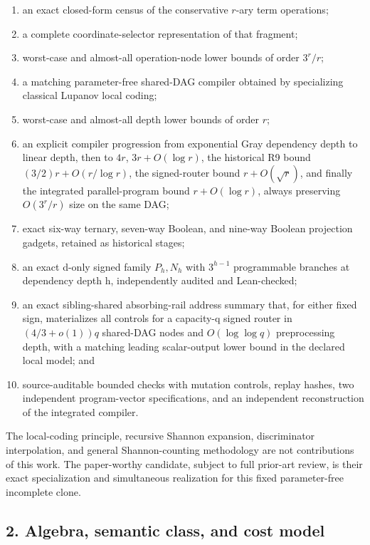 \documentclass[
  11pt,
]{article}
\providecommand{\tightlist}{%
  \setlength{\itemsep}{0pt}\setlength{\parskip}{0pt}}
\theoremstyle{definition}
\theoremstyle{remark}
\begin{document}
\begin{enumerate}
\def\labelenumi{\arabic{enumi}.}
\tightlist
\item
  an exact closed-form census of the conservative \(r\)-ary term
  operations;
\item
  a complete coordinate-selector representation of that fragment;
\item
  worst-case and almost-all operation-node lower bounds of order
  \(3^r/r\);
\item
  a matching parameter-free shared-DAG compiler obtained by specializing
  classical Lupanov local coding;
\item
  worst-case and almost-all depth lower bounds of order \(r\);
\item
  an explicit compiler progression from exponential Gray dependency
  depth to linear depth, then to \(4r\), \(3r+O(\log r)\), the
  historical R9 bound \((3/2)r+O(r/\log r)\), the signed-router bound
  \(r+O(\sqrt{r})\), and finally the integrated parallel-program bound
  \(r+O(\log r)\), always preserving \(O(3^r/r)\) size on the same DAG;
\item
  exact six-way ternary, seven-way Boolean, and nine-way Boolean
  projection gadgets, retained as historical stages;
\item
  an exact d-only signed family \(P_h,N_h\) with \(3^{h-1}\)
  programmable branches at dependency depth h, independently audited and
  Lean-checked;
\item
  an exact sibling-shared absorbing-rail address summary that, for
  either fixed sign, materializes all controls for a capacity-q signed
  router in \((4/3+o(1))q\) shared-DAG nodes and \(O(\log \log q)\)
  preprocessing depth, with a matching leading scalar-output lower bound
  in the declared local model; and
\item
  source-auditable bounded checks with mutation controls, replay hashes,
  two independent program-vector specifications, and an independent
  reconstruction of the integrated compiler.
\end{enumerate}

The local-coding principle, recursive Shannon expansion, discriminator
interpolation, and general Shannon-counting methodology are not
contributions of this work. The paper-worthy candidate, subject to full
prior-art review, is their exact specialization and simultaneous
realization for this fixed parameter-free incomplete clone.

\hypertarget{algebra-semantic-class-and-cost-model}{%
\subsection{2. Algebra, semantic class, and cost
model}\label{algebra-semantic-class-and-cost-model}}
\end{document}
